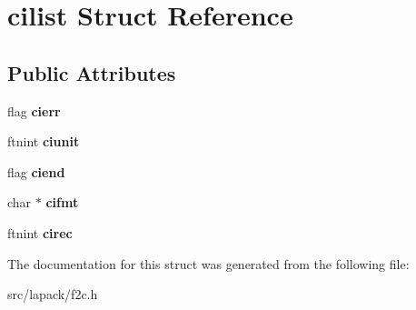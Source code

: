 \hypertarget{structcilist}{\section{cilist \-Struct \-Reference}
\label{structcilist}
}
\subsection*{\-Public \-Attributes}
\begin{DoxyCompactItemize}
\item 
\hypertarget{structcilist_aaa609be8bdf78a8fc7ba35b2ed0e6083}{flag {\bfseries cierr}}\label{structcilist_aaa609be8bdf78a8fc7ba35b2ed0e6083}

\item 
\hypertarget{structcilist_a3e5d0438673d14f5889fb6a3e712a076}{ftnint {\bfseries ciunit}}\label{structcilist_a3e5d0438673d14f5889fb6a3e712a076}

\item 
\hypertarget{structcilist_af16867fbc88cc3b26ecdedd0259fc5f5}{flag {\bfseries ciend}}\label{structcilist_af16867fbc88cc3b26ecdedd0259fc5f5}

\item 
\hypertarget{structcilist_a8c5159e1728cd9954138ecb392f04b8c}{char $\ast$ {\bfseries cifmt}}\label{structcilist_a8c5159e1728cd9954138ecb392f04b8c}

\item 
\hypertarget{structcilist_ace7c117f446a91e75e9f920fcff86546}{ftnint {\bfseries cirec}}\label{structcilist_ace7c117f446a91e75e9f920fcff86546}

\end{DoxyCompactItemize}


\-The documentation for this struct was generated from the following file\-:\begin{DoxyCompactItemize}
\item 
src/lapack/f2c.\-h\end{DoxyCompactItemize}
